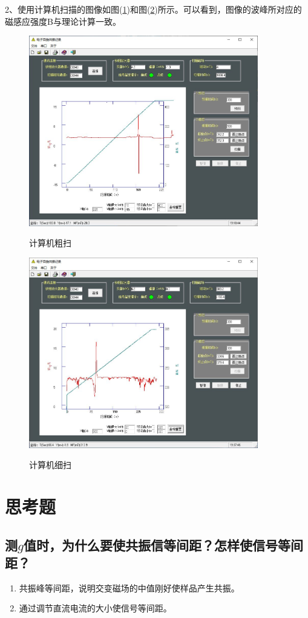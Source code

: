 \documentclass[a4paper]{article}
\begin{document}
2、使用计算机扫描的图像如图(\ref{datafig3})和图(\ref{datafig4})所示。可以看到，图像的波峰所对应的磁感应强度B与理论计算一致。
\begin{figure}[!h]
\centering
\includegraphics[width=10cm]{img/捕获.jpg}\\
\caption{计算机粗扫}\label{datafig3}
\end{figure}
\begin{figure}[!h]
\centering
\includegraphics[width=10cm]{img/细扫.jpg}\\
\caption{计算机细扫}\label{datafig4}
\end{figure}


\section{思考题}
\subsection{测$ g $值时，为什么要使共振信等间距？怎样使信号等间距？}
\begin{enumerate}
\item 共振峰等间距，说明交变磁场的中值刚好使样品产生共振。
\item 通过调节直流电流的大小使信号等间距。
\end{enumerate}
\end{document}
